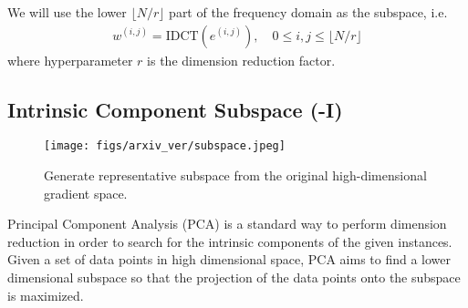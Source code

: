 We will use the lower $\lfloor N/r \rfloor$ part of the frequency domain as the subspace, i.e.
\begin{align}
    w^{(i,j)} = \text{IDCT}(e^{(i,j)}),\quad 0\leq i,j \leq \lfloor N/r \rfloor
\end{align}
where hyperparameter $r$ is the dimension reduction factor.



\subsection{Intrinsic Component Subspace (\name-I)}
\label{sec:name-I}
\begin{figure}
    \centering
    \texttt{[image: figs/arxiv\_ver/subspace.jpeg]}
    \caption{Generate representative subspace from the original high-dimensional gradient space.}
    \label{fig:bases_generation}
    \vspace{-0.5cm}
\end{figure}

Principal Component Analysis (PCA)\cite{wold1987principal} is a standard way to perform dimension reduction in order to search for the intrinsic components of the given instances. Given a set of data points in high dimensional space, PCA aims to find a lower dimensional subspace so that the projection of the data points onto the subspace is maximized. 

